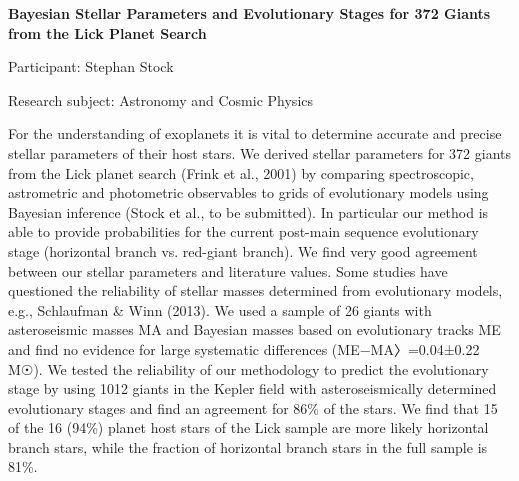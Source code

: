 \begin{minipage}[t]{1.0\textwidth}

\begin{center}

{{\large\bfseries Bayesian Stellar Parameters and Evolutionary Stages for 372 Giants from the Lick Planet Search}\par}

\end{center}

{\noindent Participant: Stephan Stock\par} 

{\noindent Research subject: Astronomy and Cosmic Physics\par}\medskip

\noindent For the understanding of exoplanets it is vital to determine accurate and precise stellar parameters of their host stars. We derived stellar parameters for 372 giants from the Lick planet search (Frink et al., 2001) by comparing spectroscopic, astrometric and photometric observables to grids of evolutionary models using Bayesian inference (Stock et al., to be submitted). In particular our method is able to provide probabilities for the current post-main sequence evolutionary stage (horizontal branch vs. red-giant branch). We find very good agreement between our stellar parameters and literature values. Some studies have questioned the reliability of stellar masses determined from evolutionary models, e.g., Schlaufman \& Winn (2013). We used a sample of 26 giants with asteroseismic masses MA and Bayesian masses based on evolutionary tracks  ME and find no evidence for large systematic differences (ME−MA〉=0.04±0.22 M☉). We tested the reliability of our methodology to predict the evolutionary stage by using 1012 giants in the Kepler field with asteroseismically determined evolutionary stages and find an agreement for 86\% of the stars. We find that 15 of the 16 (94\%)  planet host stars of the Lick sample are more likely horizontal branch stars, while the fraction of horizontal branch stars in the full sample is 81\%.\par\end{minipage}

\hfill 

